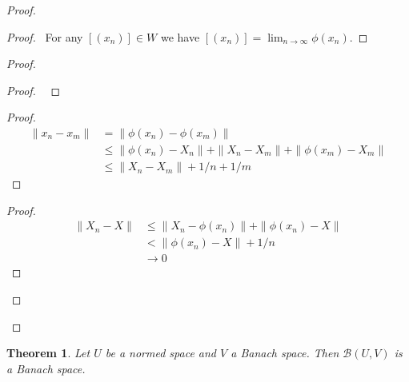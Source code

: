 \documentclass{book}
\let\qed\relax
\newtheorem{thm}[ax]{Theorem}
\theoremstyle{definition}
\begin{document}
\begin{proof}
\pf
{}
\begin{proof}
	\pf\ For any $[(x_n)] \in W$ we have $[(x_n)] = \lim_{n \rightarrow \infty} \phi(x_n)$.
\end{proof}
\begin{proof}
	\begin{proof}
		\pf\ 
	\end{proof}
	\begin{proof}
		\pf
		\begin{align*}
			\| x_n - x_m \| & = \| \phi(x_n) - \phi(x_m) \| \\
			& \leq \| \phi(x_n) - X_n \| + \| X_n - X_m \| + \| \phi(x_m) - X_m \| \\
			& \leq \| X_n - X_m \| + 1/n + 1/m
		\end{align*}
	\end{proof}
	\begin{proof}
		\pf
		\begin{align*}
			\| X_n - X \| & \leq \| X_n - \phi(x_n) \| + \| \phi(x_n) - X \| \\
			& < \| \phi(x_n) - X \| + 1/n \\
			& \rightarrow 0
		\end{align*}
	\end{proof}
\end{proof}
\qed
\end{proof}

\begin{thm}
Let $U$ be a normed space and $V$ a Banach space. Then $\mathcal{B}(U,V)$ is a Banach space.
\end{thm}
\end{document}
